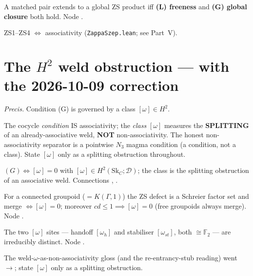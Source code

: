 \documentclass[11pt]{article}
\begin{document}
\begin{theorem}
A matched pair extends to a global ZS product iff \textbf{(L) freeness} and \textbf{(G) global
closure} both hold. Node .
\end{theorem}

\begin{theorem}
ZS1--ZS4 $\iff$ associativity (\texttt{ZappaSzep.lean}; see Part~V).
\end{theorem}

\section{The $H^2$ weld obstruction --- with the 2026-10-09 correction}
\emph{Precis.} Condition (G) is governed by a class $[ω]\in H^2$.

\begin{flag}
The cocycle \emph{condition} IS associativity; the \emph{class} $[ω]$ measures the
\textbf{SPLITTING} of an already-associative weld, \textbf{NOT} non-associativity. The honest
non-associativity separator is a pointwise $N_3$ magma condition (a condition, not a class). State
$[ω]$ only as a splitting obstruction throughout.
\end{flag}

\begin{theorem}[(G) $\iff$ ${[ω]=0}$, \grade{proved}]
$(G)\iff[ω]=0$ with $[ω]\in H^2(\mathrm{Sk}_C;𝒟)$; the class is the splitting obstruction of an
associative weld. Connections ,
.
\end{theorem}

\begin{theorem}
For a connected groupoid ($=K(Γ,1)$) the ZS defect is a Schreier factor set and merge
$\iff[ω]=0$; moreover $cd\leq1\implies[ω]=0$ (free groupoids always merge). Node
.
\end{theorem}

\begin{theorem}
The two $[ω]$ sites --- handoff $[ω_h]$ and stabiliser $[ω_{st}]$, both $\cong 𝔽_2$ --- are
irreducibly distinct. Node .
\end{theorem}

\begin{flag}[DEMOTED 2026-10-09]
The weld-$ω$-as-non-associativity gloss (and the re-entrancy-stub reading) went
$\to$; state $[ω]$ only as a splitting obstruction.
\end{flag}
\end{document}
